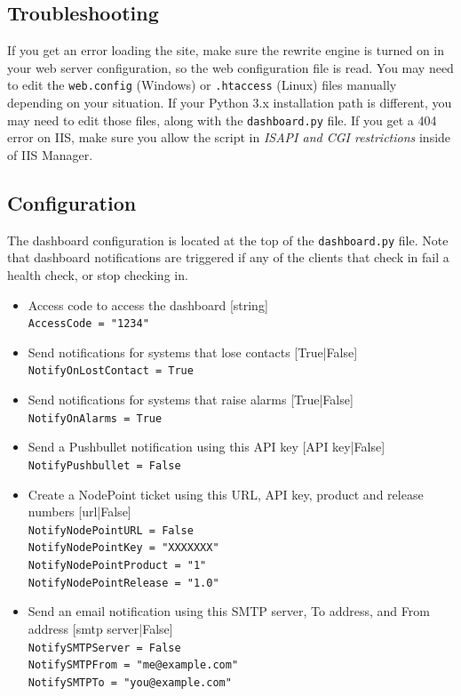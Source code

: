 \documentclass[11pt]{article}
\begin{document}
\subsection{Troubleshooting}

If you get an error loading the site, make sure the rewrite engine is turned on in your web server configuration, so the web configuration file is read. You may need to edit the \texttt{web.config} (Windows) or \texttt{.htaccess} (Linux) files manually depending on your situation. If your Python 3.x installation path is different, you may need to edit those files, along with the \texttt{dashboard.py} file. If you get a 404 error on IIS, make sure you allow the script in \textit{ISAPI and CGI restrictions} inside of IIS Manager.

\subsection{Configuration}

The dashboard configuration is located at the top of the \texttt{dashboard.py} file. Note that dashboard notifications are triggered if any of the clients that check in fail a health check, or stop checking in.

\begin{itemize}
\item Access code to access the dashboard [string]\\
\texttt{AccessCode = "1234"}
\item Send notifications for systems that lose contacts [True|False]\\
\texttt{NotifyOnLostContact = True}
\item Send notifications for systems that raise alarms [True|False]\\
\texttt{NotifyOnAlarms = True}
\item Send a Pushbullet notification using this API key [API key|False]\\
\texttt{NotifyPushbullet = False}
\item Create a NodePoint ticket using this URL, API key, product and release numbers [url|False]\\
\texttt{NotifyNodePointURL = False}\\
\texttt{NotifyNodePointKey = "XXXXXXX"}\\
\texttt{NotifyNodePointProduct = "1"}\\
\texttt{NotifyNodePointRelease = "1.0"}
\item Send an email notification using this SMTP server, To address, and From address [smtp server|False]\\
\texttt{NotifySMTPServer = False}\\
\texttt{NotifySMTPFrom = "me@example.com"}\\
\texttt{NotifySMTPTo = "you@example.com"}
\end{itemize}
\end{document}
